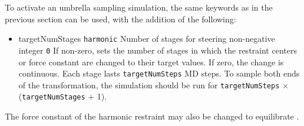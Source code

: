 To activate an umbrella sampling simulation, the same keywords as in the previous section can be used, with the addition of the following:
\begin{itemize}

\item %
  \keydef
    {targetNumStages}{%
    \texttt{harmonic}}{%
    Number of stages for steering}{%
    non-negative integer}{%
    \texttt{0}}{%
    If non-zero, sets the number of stages in which the restraint centers
    or force constant are changed to their target values. If zero, the change
    is continuous. Each stage lasts \texttt{targetNumSteps} MD steps.
    To sample both ends of the transformation, the simulation
    should be run for \texttt{targetNumSteps} $\times$ (\texttt{targetNumStages} + 1).}

\end{itemize}


\label{sec:colvarbias_ti}

The force constant of the harmonic restraint may also be changed to equilibrate \cite{Deng2009}.

